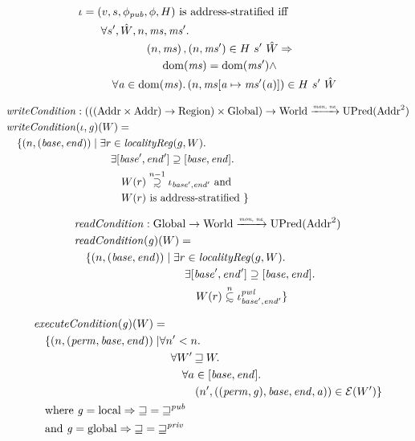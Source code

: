 \documentclass[a4paper]{article}
\newcommand{\update}[2]{[#1 \mapsto #2]}
\newcommand{\monnefun}{\xrightarrow{\textit{\tiny{mon, ne}}}}
\newcommand{\fun}{\rightarrow}
\newcommand\subsetsim{\mathrel{\ooalign{\raise.2ex\hbox{$\subset$}\cr
      \hidewidth\lower.8ex\hbox{\scalebox{0.9}{$\sim$}}\hidewidth\cr}}}
\newcommand\supsetsim{\mathrel{\ooalign{\raise.2ex\hbox{$\supset$}\cr
      \hidewidth\lower.8ex\hbox{\scalebox{0.9}{$\sim$}}\hidewidth\cr}}}
\newcommand{\nsubsim}[1][n]{\stackrel{\tiny{#1}}{\subsetsim}}
\newcommand{\nsupsim}[1][n]{\stackrel{\tiny{#1}}{\supsetsim}}
\DeclareMathOperator{\dom}{dom}
\newcommand{\var}[1]{\mathit{#1}}
\newcommand{\hs}{\var{ms}}
\newcommand{\ms}{\hs}
\newcommand{\gl}{\var{g}}
\newcommand{\addr}{\var{a}}
\newcommand{\start}{\var{base}}
\newcommand{\addrend}{\var{end}}
\newcommand{\perm}{\var{perm}}
\newcommand{\pwl}{\var{pwl}}
\newcommand{\plainfun}[2]{
  \ifthenelse{\equal{#2}{}}
  {\mathit{#1}}
  {\mathit{#1}(#2)}
}
\newcommand{\readCond}[1]{\plainfun{readCondition}{#1}}
\newcommand{\writeCond}[1]{\plainfun{writeCondition}{#1}}
\newcommand{\execCond}[1]{\plainfun{executeCondition}{#1}}
\newcommand{\future}{\mathbin{\sqsupseteq}}
\newcommand{\pub}{\var{pub}}
\newcommand{\futurewk}{\mathbin{\sqsupseteq}^{\var{pub}}}
\newcommand{\futurestr}{\mathbin{\sqsupseteq}^{\var{priv}}}
\newcommand{\asmType}{\plaindom{AsmType}}
\newcommand{\plaindom}[1]{\mathrm{#1}}
\newcommand{\Addrs}{\plaindom{Addr}}
\newcommand{\Globals}{\plaindom{Global}}
\newcommand{\Regions}{\plaindom{Region}}
\newcommand{\Worlds}{\plaindom{World}}
\newcommand{\UPred}[1]{\plaindom{UPred}(#1)}
\newcommand{\intr}[2]{\mathcal{#1}}
\newcommand{\exprintr}[1]{\intr{E}{#1}}
\newcommand{\stder}{\exprintr{\asmType}}
\newcommand{\npair}[2][n]{\left(#1,#2 \right)}
\newcommand{\plainperm}[1]{\mathrm{#1}}
\newcommand{\local}{\plainperm{local}}
\newcommand{\glob}{\plainperm{global}}
\begin{document}
\begin{align*}
&\iota = (v,s,\phi_\pub,\phi,H) \text{ is address-stratified iff }\\
&\qquad\begin{multlined}
  \forall s', \hat{W}, n, \ms, \ms' \ldotp \\
  \npair{\ms},\npair{\ms'} \in H~ s'~ \hat{W} \Rightarrow \\
  \dom(\ms) = \dom(\ms') \wedge \\
  \forall \addr \in
  \dom(\ms)\ldotp \npair{\ms\update{\addr}{\ms'(\addr)}} \in H~ s'~ \hat{W}
\end{multlined}
\end{align*}

\begin{align*}
  & \writeCond{} : (((\Addrs\times\Addrs) \fun\Regions) \times \Globals) \fun \Worlds \monnefun \UPred{\Addrs^2}  \\
  & \writeCond{}(\iota,\gl)(W) =  \\
  & \quad \begin{aligned}[t]
    \{ \npair{(\start,\addrend)} \mid & \;\exists r \in \var{localityReg}(g,W) \ldotp \\
    & \;\quad \exists [\start',\addrend'] \supseteq [\start,\addrend] \ldotp \\
    & \;\qquad W(r)\nsupsim[n-1] \iota_{\start',\addrend'} \text{ and }\\
    & \;\qquad W(r) \text{ is address-stratified } \}
  \end{aligned}
\end{align*}

\begin{align*}
  & \readCond{} : \Globals \fun \Worlds \monnefun \UPred{\Addrs^2}  \\
  & \readCond{}(\gl)(W) =  \\
  & \quad \begin{aligned}[t]
    \{ \npair{(\start,\addrend)} \mid & \;\exists r \in \var{localityReg}(g,W) \ldotp \\
    & \;\quad \exists [\start',\addrend'] \supseteq [\start,\addrend] \ldotp \\
    & \;\qquad W(r)\nsubsim[n] \iota_{\start',\addrend'}^\pwl \}
  \end{aligned}
\end{align*}

\begin{align*}
  & \execCond{}(\gl)(W) = \\
  & \quad
    \begin{aligned}[t]
      \{ \npair{(\perm,\start,\addrend)} \mid &  \forall n' < n \ldotp\\
      & \quad \forall W' \future W \ldotp\\
      & \qquad\forall a \in [\start,\addrend] \ldotp\\
      & \qquad \quad \npair[n']{((\perm,\gl),\start,\addrend,\addr)} \in \stder(W')\}
    \end{aligned} \\
  & \quad \text{where } \gl = \local \Rightarrow \future = \futurewk \\
  & \quad \text{and } \gl = \glob \Rightarrow \future = \futurestr
\end{align*}
\end{document}
